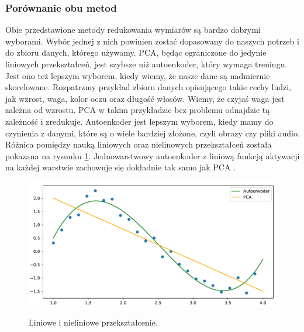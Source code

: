 \documentclass[a4paper,12pt,oneside]{book} %
\begin{document}
\subsubsection{Porównanie obu metod}
Obie przedstawione metody redukowania wymiarów są bardzo dobrymi wyborami. Wybór jednej z nich powinien zostać dopasowany do naszych potrzeb i do zbioru danych, którego używamy. PCA, będąc ograniczone do jedynie liniowych przekształceń, jest szybsze niż autoenkoder, który wymaga treningu. Jest ono też lepszym wyborem, kiedy wiemy, że nasze dane są nadmiernie skorelowane. Rozpatrzmy przykład zbioru danych opisującego takie cechy ludzi, jak wzrost, waga, kolor oczu oraz długość włosów. Wiemy, że czyjaś waga jest zależna od wzrostu. PCA w takim przykładzie bez problemu odnajdzie tą zależność i zredukuje. Autoenkoder jest lepszym wyborem, kiedy mamy do czynienia z danymi, które są o wiele bardziej złożone, czyli obrazy czy pliki audio. Różnica pomiędzy nauką liniowych oraz nielinowych przekształceń została pokazana na rysunku \ref{fig:pcavsautoenkoder}.  
Jednowarstwowy autoenkoder z liniową funkcją aktywacji na każdej warstwie zachowuje się dokładnie tak samo jak PCA \cite{aevspca}.
\begin{figure}[h!]
	\centering
	\includegraphics[width=14cm]{pcavsautoencoder.pdf}
	\label{fig:pcavsautoenkoder}
	\caption{Liniowe i nieliniowe przekształcenie.}
\end{figure}
\end{document}
